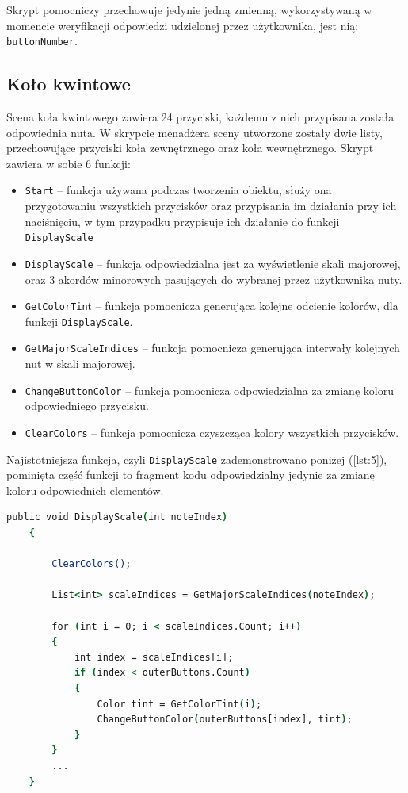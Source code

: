 Skrypt pomocniczy przechowuje jedynie jedną zmienną, wykorzystywaną w momencie weryfikacji odpowiedzi udzielonej przez użytkownika, jest nią: \texttt{buttonNumber}.

\subsection{Koło kwintowe}

Scena koła kwintowego zawiera 24 przyciski, każdemu z nich przypisana została odpowiednia nuta. W skrypcie menadżera sceny utworzone zostały dwie listy, przechowujące przyciski koła zewnętrznego oraz koła wewnętrznego. Skrypt zawiera w sobie 6 funkcji:

\begin{itemize}
\item \texttt{Start} -- funkcja używana podczas tworzenia obiektu, służy ona przygotowaniu wszystkich przycisków oraz przypisania im działania przy ich naciśnięciu, w tym przypadku przypisuje ich działanie do funkcji \texttt{DisplayScale}
\item \texttt{DisplayScale} -- funkcja odpowiedzialna jest za wyświetlenie skali majorowej, oraz 3 akordów minorowych pasujących do wybranej przez użytkownika nuty. 
\item \texttt{GetColorTin}t -- funkcja pomocnicza generująca kolejne odcienie kolorów, dla funkcji \texttt{DisplayScale}.
\item \texttt{GetMajorScaleIndices} -- funkcja pomocnicza generująca interwały kolejnych nut w skali majorowej.
\item \texttt{ChangeButtonColor} -- funkcja pomocnicza odpowiedzialna za zmianę koloru odpowiedniego przycisku.
\item \texttt{ClearColors} -- funkcja pomocnicza czyszcząca kolory wszystkich przycisków.
\end{itemize}

Najistotniejsza funkcja, czyli \texttt{DisplayScale} zademonstrowano poniżej (\ref{lst:5}), pominięta część funkcji to fragment kodu odpowiedzialny jedynie za zmianę koloru odpowiednich elementów.

\begin{lstlisting}[language=csh,caption=Funkcja \texttt{DisplayScale}, label=lst:5]
    public void DisplayScale(int noteIndex)
    {

        ClearColors();

        List<int> scaleIndices = GetMajorScaleIndices(noteIndex);

        for (int i = 0; i < scaleIndices.Count; i++)
        {
            int index = scaleIndices[i];
            if (index < outerButtons.Count)
            {
                Color tint = GetColorTint(i);
                ChangeButtonColor(outerButtons[index], tint);
            }
        }
        ...
    }
\end{lstlisting}
